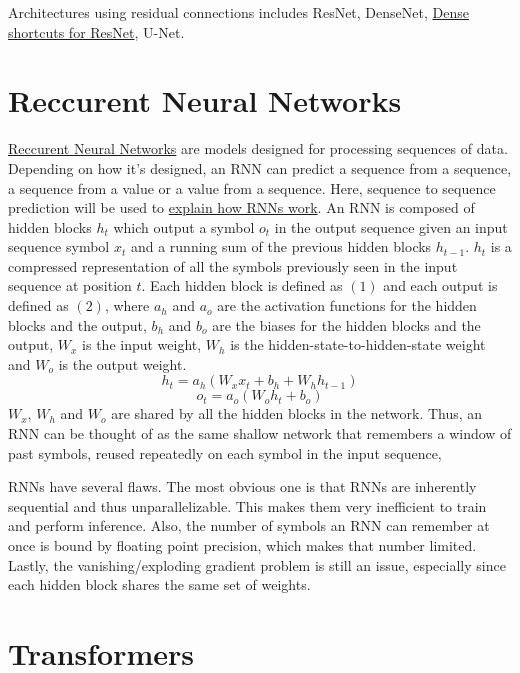\documentclass{article}
\begin{document}
Architectures using residual connections includes ResNet, DenseNet, \href{https://openaccess.thecvf.com/content/WACV2021/papers/Zhang_ResNet_or_DenseNet_Introducing_Dense_Shortcuts_to_ResNet_WACV_2021_paper.pdf}{Dense shortcuts for ResNet}, U-Net.

\section{Reccurent Neural Networks}
\href{https://stanford.edu/~shervine/teaching/cs-230/cheatsheet-recurrent-neural-networks/}{Reccurent Neural Networks} are models designed for processing sequences of data. Depending on how it's designed, an RNN can predict a sequence from a sequence, a sequence from a value or a value from a sequence. Here, sequence to sequence prediction will be used to \href{https://www.mdpi.com/information/information-15-00517/article_deploy/html/images/information-15-00517-g001-550.jpg}{explain how RNNs work}.
An RNN is composed of hidden blocks $h_t$ which output a symbol $o_t$ in the output sequence given an input sequence symbol $x_t$ and a running sum of the previous hidden blocks $h_{t - 1}$. $h_t$ is a compressed representation of all the symbols previously seen in the input sequence at position $t$. Each hidden block is defined as $(1)$ and each output is defined as $(2)$, where $a_h$ and $a_o$ are the activation functions for the hidden blocks and the output, $b_h$ and $b_o$ are the biases for the hidden blocks and the output, $W_x$ is the input weight, $W_h$ is the hidden-state-to-hidden-state weight and $W_o$ is the output weight.
\[ h_t = a_h(W_x x_t + b_h + W_h h_{t - 1}) \tag{1} \]
\[ o_t = a_o(W_o h_t + b_o) \tag{2} \]
$W_x$, $W_h$ and $W_o$ are shared by all the hidden blocks in the network. Thus, an RNN can be thought of as the same shallow network that remembers a window of past symbols, reused repeatedly on each symbol in the input sequence,

RNNs have several flaws. The most obvious one is that RNNs are inherently sequential and thus unparallelizable. This makes them very inefficient to train and perform inference. Also, the number of symbols an RNN can remember at once is bound by floating point precision, which makes that number limited. Lastly, the vanishing/exploding gradient problem is still an issue, especially since each hidden block shares the same set of weights.

\section{Transformers}
\end{document}
